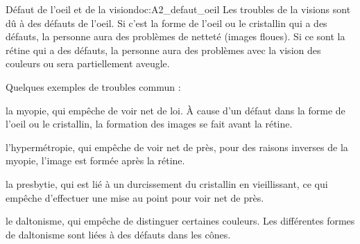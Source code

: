 

\begin{doc}{Défaut de l'oeil et de la vision}{doc:A2_defaut_oeil}
  Les troubles de la visions sont dû à des défauts de l'oeil.
  Si c'est la forme de l'oeil ou le cristallin qui a des défauts, la personne aura des problèmes de netteté (images floues).
  Si ce sont la rétine qui a des défauts, la personne aura des problèmes avec la vision des couleurs ou sera partiellement aveugle.

  Quelques exemples de troubles commun :
  \begin{listePoints}
    \item la myopie, qui empêche de voir net de loi. À cause d'un défaut dans la forme de l'oeil ou le cristallin, la formation des images se fait avant la rétine.
    \item l'hypermétropie, qui empêche de voir net de près, pour des raisons inverses de la myopie, l'image est formée après la rétine.
    \item la presbytie, qui est lié à un durcissement du cristallin en vieillissant, ce qui empêche d'effectuer une mise au point pour voir net de près.
    \item le daltonisme, qui empêche de distinguer certaines couleurs. Les différentes formes de daltonisme sont liées à des défauts dans les cônes.
  \end{listePoints}
\end{doc}